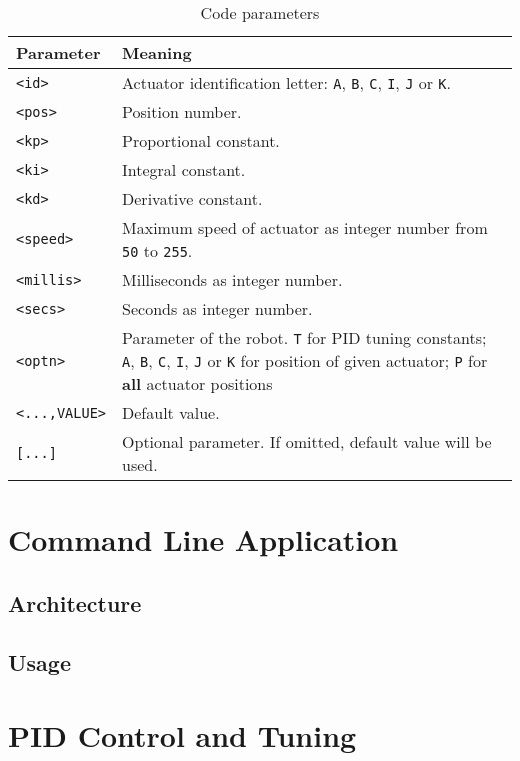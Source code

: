 \begingroup
\setlength{\tabcolsep}{10pt}
\renewcommand{\arraystretch}{1.5}
\begin{table}[h]
    \centering
    \caption{Code parameters}
    \label{tab:code-parameters}
    \begin{tabular}{p{}p{}}
    \toprule
    Parameter & Meaning \\ \midrule
    \texttt{<id>} & Actuator identification letter: \texttt{A}, \texttt{B}, \texttt{C}, \texttt{I}, \texttt{J} or \texttt{K}. \\
    \texttt{<pos>} & Position number. \\
    \texttt{<kp>} & Proportional constant. \\
    \texttt{<ki>} & Integral constant. \\
    \texttt{<kd>} & Derivative constant. \\
    \texttt{<speed>} & Maximum speed of actuator as integer number from \texttt{50} to \texttt{255}. \\
    \texttt{<millis>} & Milliseconds as integer number. \\
    \texttt{<secs>} & Seconds as integer number. \\
    \texttt{<optn>} & Parameter of the robot. \texttt{T} for PID tuning constants; \texttt{A}, \texttt{B}, \texttt{C}, \texttt{I}, \texttt{J} or \texttt{K} for position of given actuator; \texttt{P} for \textbf{all} actuator positions\\
    \texttt{<...,VALUE>} & Default value. \\
    \texttt{[...]} & Optional parameter. If omitted, default value will be used. \\
    \bottomrule
    \end{tabular}
\end{table}
\endgroup

\section{Command Line Application}

\subsection{Architecture}


\subsection{Usage}


\section{PID Control and Tuning}

